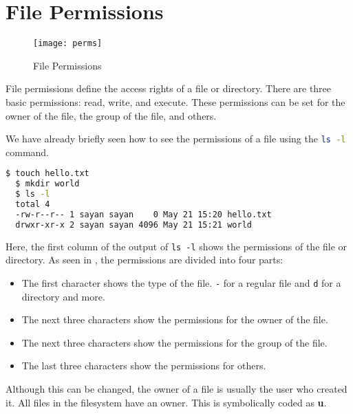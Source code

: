 \vfill
\pagebreak
\section{File Permissions}

\begin{figure}[hb]
  \texttt{[image: perms]}
  \caption[File Permissions]{File Permissions}
\end{figure}

\begin{definition}
  File permissions define the access rights of a file or directory.
  There are three basic permissions: read, write, and execute.
  These permissions can be set for the owner of the file, the group of the file, and others.
\end{definition}

We have already briefly seen how to see the permissions of a file using the \lstinline[language=bash]{ls -l} command.

\begin{lstlisting}[language=bash]
  $ touch hello.txt
  $ mkdir world
  $ ls -l
  total 4
  -rw-r--r-- 1 sayan sayan    0 May 21 15:20 hello.txt
  drwxr-xr-x 2 sayan sayan 4096 May 21 15:21 world
\end{lstlisting}

Here, the first column of the output of \texttt{ls -l} shows the permissions of the file or directory.
As seen in , the permissions are divided into four parts:

\begin{itemize}
  \item The first character shows the type of the file. \texttt{-} for a regular file and \texttt{d} for a directory and more.
  \item The next three characters show the permissions for the owner of the file.
  \item The next three characters show the permissions for the group of the file.
  \item The last three characters show the permissions for others.
\end{itemize}

\begin{definition}[Owner]
  Although this can be changed, the owner of a file is usually the user who created it.
  All files in the filesystem have an owner.
  This is symbolically coded as \textbf{u}.
\end{definition}


